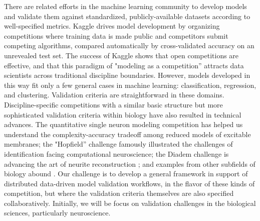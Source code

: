 \documentclass[11pt,letterpaper]{article}
\begin{document}
There are related efforts in the machine learning community to develop models and validate them against standardized, publicly-available datasets according to well-specified metrics. Kaggle \cite{kaggle_url} drives model development by organizing competitions where training data is made public and competitors submit competing algorithms, compared automatically by cross-validated accuracy on an unrevealed test set. The success of Kaggle \cite{carpenter_may_2011} shows that open competitions are effective, and that this paradigm of "modeling as a competition'' attracts data scientists across traditional discipline boundaries. However, models developed in this way fit only a few general cases in machine learning: classification, regression, and clustering. Validation criteria are straightforward in these domains. Discipline-specific competitions with a similar basic structure but more sophisticated validation criteria within biology have also resulted in technical advances.  The quantitative single neuron modeling competition \cite{jolivet_quantitative_2008} has helped us understand the complexity-accuracy tradeoff among reduced models of excitable membranes; the "Hopfield'' challenge \cite{hopfield_what_2000} famously illustrated the challenges of identification facing computational neuroscience; the Diadem challenge is advancing the art of neurite reconstruction \cite{diadem_url}; and examples from other subfields of biology abound \cite{dream_url}. Our challenge is to develop a general framework in support of distributed data-driven model validation workflows, in the flavor of these kinds of competition, but where the validation criteria themselves are also specified collaboratively. Initially, we will be focus on validation challenges in the biological sciences, particularly neuroscience. 

\end{document}
